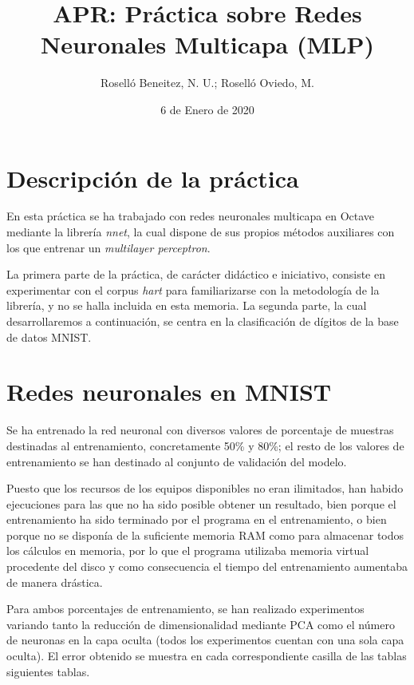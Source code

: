 \documentclass[a4paper]{article}
\begin{document}
\author{Roselló Beneitez, N. U.; Roselló Oviedo, M.}
\title{APR: Práctica sobre Redes Neuronales Multicapa (MLP)}
\date{6 de Enero de 2020}
\maketitle{}
\thispagestyle{empty}

\newpage
\tableofcontents
\listoffigures

\newpage
\section{Descripción de la práctica}
\quad En esta práctica se ha trabajado con redes neuronales multicapa en Octave mediante la librería \textit{nnet}, la cual dispone de sus propios métodos auxiliares con los que entrenar un \textit{multilayer perceptron}.

\quad La primera parte de la práctica, de carácter didáctico e iniciativo, consiste en experimentar con el corpus \textit{hart} para familiarizarse con la metodología de la librería, y no se halla incluida en esta memoria. La segunda parte, la cual desarrollaremos a continuación, se centra en la clasificación de dígitos de la base de datos MNIST.

\section{Redes neuronales en MNIST}
\quad Se ha entrenado la red neuronal con diversos valores de porcentaje de muestras destinadas al entrenamiento, concretamente 50\% y 80\%; el resto de los valores de entrenamiento se han destinado al conjunto de validación del modelo.

\quad Puesto que los recursos de los equipos disponibles no eran ilimitados, han habido ejecuciones para las que no ha sido posible obtener un resultado, bien porque el entrenamiento ha sido terminado por el programa en el entrenamiento, o bien porque no se disponía de la suficiente memoria RAM como para almacenar todos los cálculos en memoria, por lo que el programa utilizaba memoria virtual procedente del disco y como consecuencia el tiempo del entrenamiento aumentaba de manera drástica.

\quad Para ambos porcentajes de entrenamiento, se han realizado experimentos variando tanto la reducción de dimensionalidad mediante PCA como el número de neuronas en la capa oculta (todos los experimentos cuentan con una sola capa oculta). El error obtenido se muestra en cada correspondiente casilla de las tablas siguientes tablas.
\end{document}
